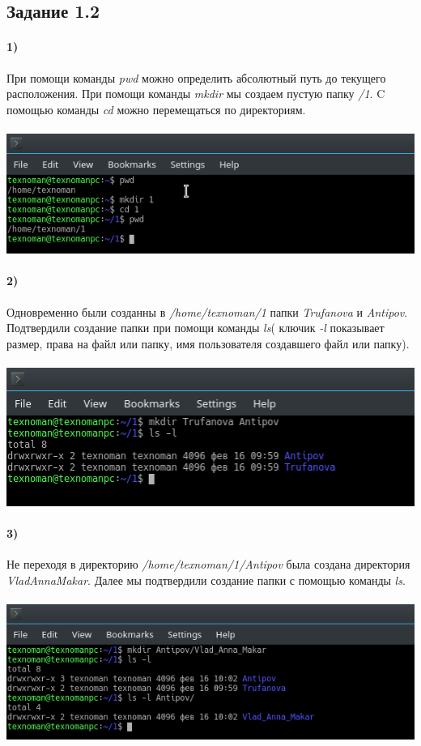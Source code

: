 \subsection*{Задание 1.2}
	\paragraph{1)}
	При помощи команды \textit{pwd} можно определить абсолютный путь до текущего расположения. При помощи команды \textit{mkdir} мы создаем пустую папку \textit{/1}. C помощью команды \textit{cd} можно перемещаться по директориям.\\
	\\
	\includegraphics[width=\textwidth]{1.png}

	\paragraph{2)}
	Одновременно были созданны в \textit{/home/texnoman/1} папки \textit{Trufanova} и \textit{Antipov}. Подтвердили создание папки при помощи команды \textit{ls}( ключик \textit{-l} показывает размер, права на файл или папку, имя пользователя создавшего файл или папку).\\
	\\
	\includegraphics[width=\textwidth]{2.png}

	\paragraph{3)}
	Не переходя в директорию \textit{/home/texnoman/1/Antipov} была создана директория \textit{VladAnnaMakar}. Далее мы подтвердили создание папки с помощью команды \textit{ls}.\\
	\\
	\includegraphics[width=\textwidth ]{3.png}

